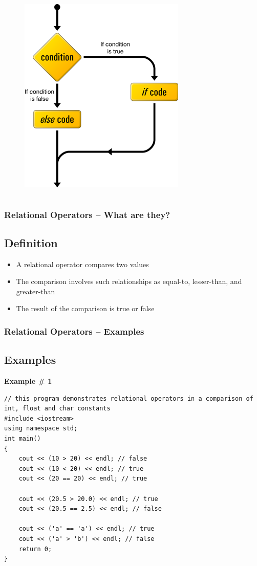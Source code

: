 \documentclass{beamer}
\begin{document}
\begin{frame}
\begin{columns}
\begin{figure}
            \includegraphics[scale=0.3]{ifelse}
        \end{figure}
    \end{columns}
\end{frame}

\begin{frame}
    \frametitle{Relational Operators -- What are they?}
    \subsection{Definition} %
    \label{sub:definition}
    \begin{itemize}
        \item A relational operator compares two values
        \item The comparison involves such relationships as equal-to, lesser-than, and greater-than
        \item The result of the comparison is true or false
    \end{itemize}
\end{frame}

\begin{frame}[fragile]
    \frametitle{Relational Operators -- Examples}
    \subsection{Examples} %
    \label{sub:examples}
    \textbf{Example \# 1}
    \lstset{style=mystyle}
    \begin{lstlisting}
// this program demonstrates relational operators in a comparison of int, float and char constants
#include <iostream>
using namespace std;
int main()
{
    cout << (10 > 20) << endl; // false
    cout << (10 < 20) << endl; // true
    cout << (20 == 20) << endl; // true

    cout << (20.5 > 20.0) << endl; // true
    cout << (20.5 == 2.5) << endl; // false

    cout << ('a' == 'a') << endl; // true
    cout << ('a' > 'b') << endl; // false
    return 0;
}\end{lstlisting}
\end{frame}
\end{document}
